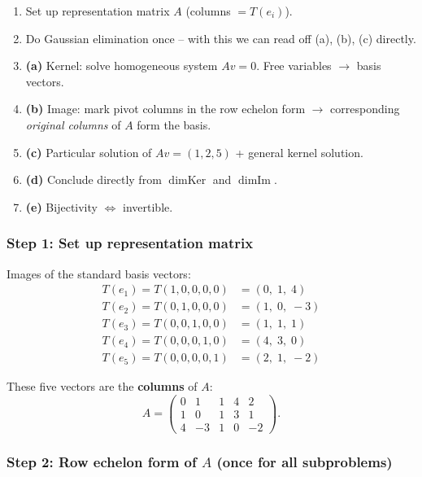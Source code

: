 \documentclass[a4paper,12pt]{article}
\begin{document}
\begin{wastun}
\begin{enumerate}[leftmargin=*, nosep]
    \item Set up representation matrix $A$ (columns $= T(e_i)$).
    \item Do Gaussian elimination once -- with this we can read off (a), (b), (c) directly.
    \item \textbf{(a)} Kernel: solve homogeneous system $Av = 0$. Free variables $\to$ basis vectors.
    \item \textbf{(b)} Image: mark pivot columns in the row echelon form $\to$ corresponding \emph{original columns} of $A$ form the basis.
    \item \textbf{(c)} Particular solution of $Av = (1,2,5)$ + general kernel solution.
    \item \textbf{(d)} Conclude directly from $\dim \text{Ker}$ and $\dim \text{Im}$.
    \item \textbf{(e)} Bijectivity $\iff$ invertible.
\end{enumerate}
\end{wastun}

\subsubsection*{Step 1: Set up representation matrix}

Images of the standard basis vectors:
\begin{align*}
T(e_1) = T(1,0,0,0,0) &= (0,\; 1,\; 4) \\
T(e_2) = T(0,1,0,0,0) &= (1,\; 0,\; -3) \\
T(e_3) = T(0,0,1,0,0) &= (1,\; 1,\; 1) \\
T(e_4) = T(0,0,0,1,0) &= (4,\; 3,\; 0) \\
T(e_5) = T(0,0,0,0,1) &= (2,\; 1,\; -2)
\end{align*}

These five vectors are the \textbf{columns} of $A$:
\[
A = \begin{pmatrix} 0 & 1 & 1 & 4 & 2 \\ 1 & 0 & 1 & 3 & 1 \\ 4 & -3 & 1 & 0 & -2 \end{pmatrix}.
\]

\subsubsection*{Step 2: Row echelon form of $A$ (once for all subproblems)}
\end{document}
